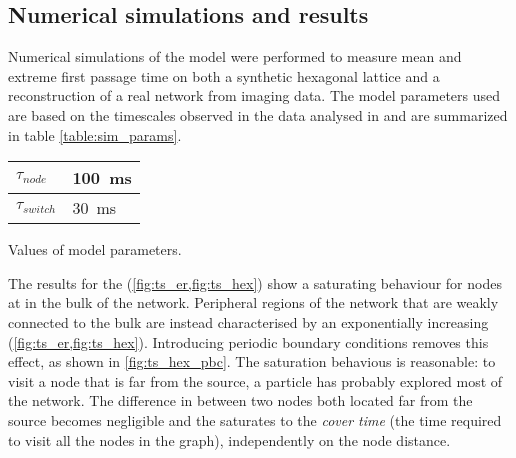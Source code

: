 \subsection{Numerical simulations and results}

Numerical simulations of the model were performed to measure mean and extreme first passage time on both a synthetic hexagonal lattice and a reconstruction of a real network from  imaging data. The model parameters used are based on the timescales observed in the  data analysed in and are summarized in table \ref{table:sim_params}.

\begin{margintable}
  \sffamily
  \begin{tabular}{@{}ll@{}}
    $\tau_{node}$   & \SI{100}{\milli\second}  \\
    \hline
    $\tau_{switch}$ & \SI{30}{\milli\second}  \\
    \hline
  \end{tabular}
  \caption{Values of model parameters.}\label{table:sim_params}
\end{margintable}

The results for the  (\cref{fig:ts_er,fig:ts_hex}) show a saturating behaviour for nodes at in the bulk of the network. Peripheral regions of the network that are weakly connected to the bulk are instead characterised by an exponentially increasing  (\cref{fig:ts_er,fig:ts_hex}). Introducing periodic boundary conditions removes this effect, as shown in \cref{fig:ts_hex_pbc}. The saturation behavious is reasonable: to visit a node that is far from the source, a particle has probably explored most of the network. The difference in  between two nodes both located far from the source becomes negligible and the  saturates to the \emph{cover time} (the time required to visit all the nodes in the graph), independently on the node distance.

